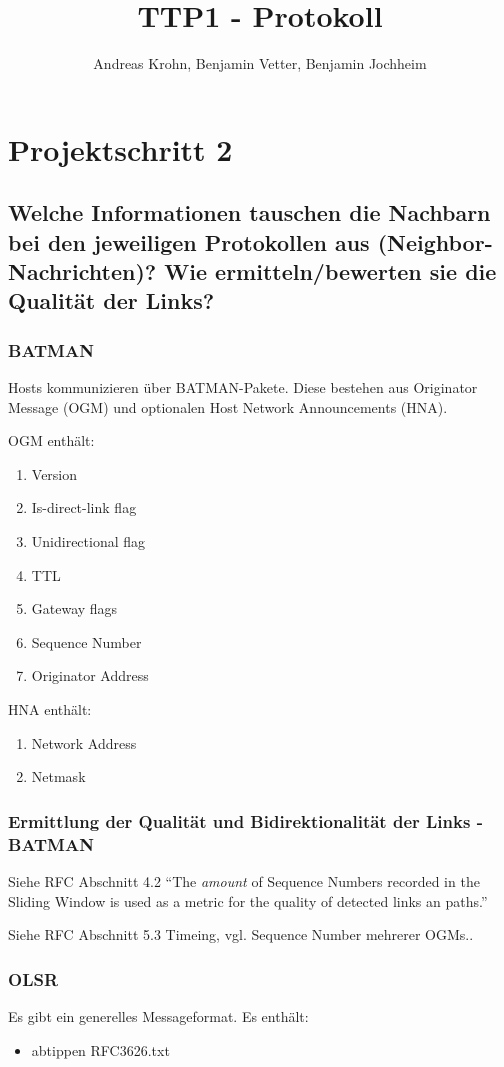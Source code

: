 \documentclass[a4paper,10pt]{article}
\title{TTP1 - Protokoll}
\author{Andreas Krohn, Benjamin Vetter, Benjamin Jochheim}
\begin{document}
\maketitle

\section{Projektschritt 2}
\subsection{Welche Informationen tauschen die Nachbarn bei den jeweiligen Protokollen aus (Neighbor-Nachrichten)? Wie ermitteln/bewerten sie die Qualität der Links?}
\subsubsection*{BATMAN}
Hosts kommunizieren über BATMAN-Pakete. Diese bestehen aus Originator Message (OGM) und optionalen Host Network Announcements (HNA).

OGM enthält:
\begin{enumerate}
  \item Version
  \item Is-direct-link flag
  \item Unidirectional flag
  \item TTL
  \item Gateway flags
  \item Sequence Number
  \item Originator Address
\end{enumerate}
HNA enthält:
\begin{enumerate}
  \item Network Address
  \item Netmask
\end{enumerate}


\subsubsection*{Ermittlung der Qualität und Bidirektionalität der Links - BATMAN}
Siehe RFC Abschnitt 4.2 "`The \emph{amount} of Sequence Numbers recorded in the Sliding Window is used as a metric for the quality of detected links an paths."'

Siehe RFC Abschnitt 5.3 Timeing, vgl. Sequence Number mehrerer OGMs..

\subsubsection*{OLSR}
Es gibt ein generelles Messageformat. Es enthält:
\begin{itemize}
  \item abtippen RFC3626.txt
\end{itemize}
\end{document}
